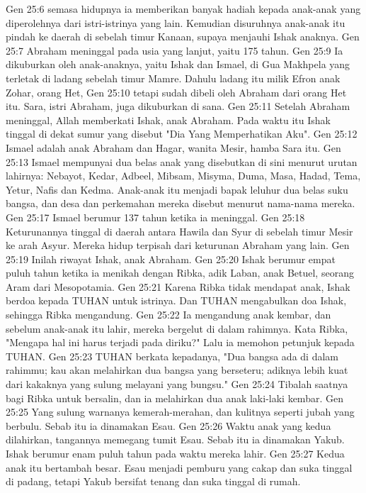 Gen 25:6  semasa hidupnya ia memberikan banyak hadiah kepada anak-anak yang diperolehnya dari istri-istrinya yang lain. Kemudian disuruhnya anak-anak itu pindah ke daerah di sebelah timur Kanaan, supaya menjauhi Ishak anaknya.
Gen 25:7  Abraham meninggal pada usia yang lanjut, yaitu 175 tahun.
Gen 25:9  Ia dikuburkan oleh anak-anaknya, yaitu Ishak dan Ismael, di Gua Makhpela yang terletak di ladang sebelah timur Mamre. Dahulu ladang itu milik Efron anak Zohar, orang Het,
Gen 25:10  tetapi sudah dibeli oleh Abraham dari orang Het itu. Sara, istri Abraham, juga dikuburkan di sana.
Gen 25:11  Setelah Abraham meninggal, Allah memberkati Ishak, anak Abraham. Pada waktu itu Ishak tinggal di dekat sumur yang disebut "Dia Yang Memperhatikan Aku".
Gen 25:12  Ismael adalah anak Abraham dan Hagar, wanita Mesir, hamba Sara itu.
Gen 25:13  Ismael mempunyai dua belas anak yang disebutkan di sini menurut urutan lahirnya: Nebayot, Kedar, Adbeel, Mibsam, Misyma, Duma, Masa, Hadad, Tema, Yetur, Nafis dan Kedma. Anak-anak itu menjadi bapak leluhur dua belas suku bangsa, dan desa dan perkemahan mereka disebut menurut nama-nama mereka.
Gen 25:17  Ismael berumur 137 tahun ketika ia meninggal.
Gen 25:18  Keturunannya tinggal di daerah antara Hawila dan Syur di sebelah timur Mesir ke arah Asyur. Mereka hidup terpisah dari keturunan Abraham yang lain.
Gen 25:19  Inilah riwayat Ishak, anak Abraham.
Gen 25:20  Ishak berumur empat puluh tahun ketika ia menikah dengan Ribka, adik Laban, anak Betuel, seorang Aram dari Mesopotamia.
Gen 25:21  Karena Ribka tidak mendapat anak, Ishak berdoa kepada TUHAN untuk istrinya. Dan TUHAN mengabulkan doa Ishak, sehingga Ribka mengandung.
Gen 25:22  Ia mengandung anak kembar, dan sebelum anak-anak itu lahir, mereka bergelut di dalam rahimnya. Kata Ribka, "Mengapa hal ini harus terjadi pada diriku?" Lalu ia memohon petunjuk kepada TUHAN.
Gen 25:23  TUHAN berkata kepadanya, "Dua bangsa ada di dalam rahimmu; kau akan melahirkan dua bangsa yang berseteru; adiknya lebih kuat dari kakaknya yang sulung melayani yang bungsu."
Gen 25:24  Tibalah saatnya bagi Ribka untuk bersalin, dan ia melahirkan dua anak laki-laki kembar.
Gen 25:25  Yang sulung warnanya kemerah-merahan, dan kulitnya seperti jubah yang berbulu. Sebab itu ia dinamakan Esau.
Gen 25:26  Waktu anak yang kedua dilahirkan, tangannya memegang tumit Esau. Sebab itu ia dinamakan Yakub. Ishak berumur enam puluh tahun pada waktu mereka lahir.
Gen 25:27  Kedua anak itu bertambah besar. Esau menjadi pemburu yang cakap dan suka tinggal di padang, tetapi Yakub bersifat tenang dan suka tinggal di rumah.
